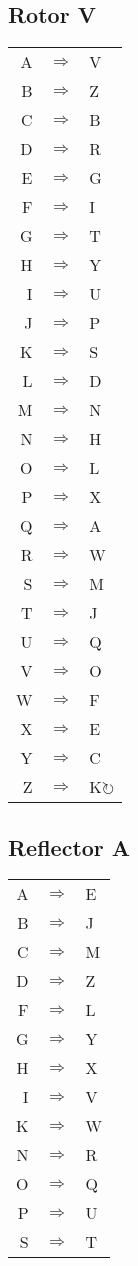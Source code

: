 \begin{multicols}{2}
\subsection{Rotor V}
\begin{supertabular}{rcl}
A & $\Rightarrow$ & V \\
B & $\Rightarrow$ & Z \\
C & $\Rightarrow$ & B \\
D & $\Rightarrow$ & R \\
E & $\Rightarrow$ & G \\
F & $\Rightarrow$ & I \\
G & $\Rightarrow$ & T \\
H & $\Rightarrow$ & Y \\
I & $\Rightarrow$ & U \\
J & $\Rightarrow$ & P \\
K & $\Rightarrow$ & S \\
L & $\Rightarrow$ & D \\
M & $\Rightarrow$ & N \\
N & $\Rightarrow$ & H \\
O & $\Rightarrow$ & L \\
P & $\Rightarrow$ & X \\
Q & $\Rightarrow$ & A \\
R & $\Rightarrow$ & W \\
S & $\Rightarrow$ & M \\
T & $\Rightarrow$ & J \\
U & $\Rightarrow$ & Q \\
V & $\Rightarrow$ & O \\
W & $\Rightarrow$ & F \\
X & $\Rightarrow$ & E \\
Y & $\Rightarrow$ & C \\
Z & $\Rightarrow$ & K$\circlearrowright$ \\
\end{supertabular}

\subsection{Reflector A}
\begin{supertabular}{rcl}
A & $\Rightarrow$ & E \\
B & $\Rightarrow$ & J \\
C & $\Rightarrow$ & M \\
D & $\Rightarrow$ & Z \\
F & $\Rightarrow$ & L \\
G & $\Rightarrow$ & Y \\
H & $\Rightarrow$ & X \\
I & $\Rightarrow$ & V \\
K & $\Rightarrow$ & W \\
N & $\Rightarrow$ & R \\
O & $\Rightarrow$ & Q \\
P & $\Rightarrow$ & U \\
S & $\Rightarrow$ & T \\
\end{supertabular}

\end{multicols}